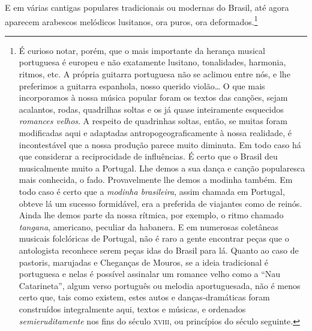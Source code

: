 E em várias cantigas populares tradicionais ou modernas do Brasil, até
agora aparecem arabescos melódicos lusitanos, ora puros, ora deformados.\footnote{É curioso notar, porém, que o mais importante da herança musical
portuguesa é europeu e não exatamente lusitano, tonalidades, harmonia,
ritmos, etc. A própria guitarra portuguesa não se aclimou entre nós, e
lhe preferimos a guitarra espanhola, nosso querido violão\ldots{} O que mais
incorporamos à nossa música popular foram os textos das canções, sejam
acalantos, rodas, quadrilhas soltas e os já quase inteiramente
esquecidos \textit{romances velhos}. A respeito de quadrinhas soltas, então,
se muitas foram modificadas aqui e adaptadas antropogeograficamente à
nossa realidade, é incontestável que a nossa produção parece muito
diminuta. Em todo caso há que considerar a reciprocidade de influências.
É certo que o Brasil deu musicalmente muito a Portugal. Lhe demos a sua
dança e canção popularesca mais conhecida, o fado. Provavelmente lhe
demos a modinha também. Em todo caso é certo que a \textit{modinha
brasileira}, assim chamada em Portugal, obteve lá um sucesso
formidável, era a preferida de viajantes como de reinós. Ainda lhe demos
parte da nossa rítmica, por exemplo, o ritmo chamado \textit{tangana},
americano, peculiar da habanera. E em numerosas coletâneas musicais
folclóricas de Portugal, não é raro a gente encontrar peças que o
antologista reconhece serem peças idas do Brasil para lá. Quanto ao caso
de pastoris, marujadas e Cheganças de Mouros, se a ideia tradicional é
portuguesa e nelas é possível assinalar um romance velho como a ``Nau
Catarineta'', algum verso português ou melodia aportuguesada, não é
menos certo que, tais como existem, estes autos e danças-dramáticas
foram construídos integralmente aqui, textos e músicas, e ordenados
\textit{semieruditamente} nos fins do século \textsc{xviii}, ou princípios do século
seguinte.}

